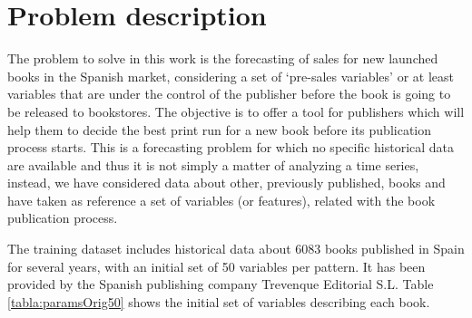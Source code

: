 \documentclass[a4paper,10pt,twocolumn,preprint,3p]{elsarticle}
\begin{document}


\section{Problem description}
\label{sec:problem}

The problem to solve in this work is the forecasting of sales for new
launched books in the Spanish market, considering a set of `pre-sales
variables' or at least variables that are under the control of the
publisher before the book is going to be released to bookstores. The
objective is to offer a tool for publishers which will help them to
decide the best print run for a new book before its publication
process starts. This is a forecasting problem for which no specific
historical data are available and thus it is not simply a matter of
analyzing a time series, instead, we have considered data about other,
previously published, books and have taken as reference a set of
variables (or features), 
related with the book publication process. 

The training dataset includes historical data about 6083 books
published in Spain for several years, with an initial set of 50
variables per pattern. It has been provided by the Spanish publishing
company Trevenque Editorial S.L. Table 
\ref{tabla:paramsOrig50} shows the initial set of variables describing
each book. 
\end{document}
